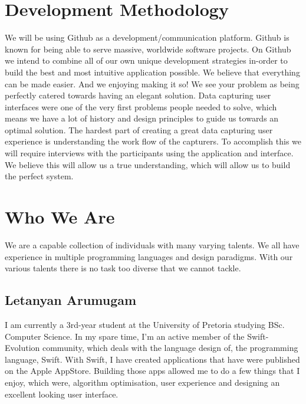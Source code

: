 \documentclass[12pt]{article}
\begin{document}
	\section{Development Methodology}
	We will be using Github as a development/communication platform. Github is known for being able to serve massive, worldwide software projects. On Github we intend to combine all of our own unique development strategies in-order to build the best and most intuitive application possible. We believe that everything can be made easier. And we enjoying making it so! We see your problem as being perfectly catered towards having an elegant solution. Data capturing user interfaces were one of the very first problems people needed to solve, which means we have a lot of history and design principles to guide us towards an optimal solution. The hardest part of creating a great data capturing user experience is understanding the work flow of the capturers. To accomplish this we will require interviews with the participants using the application and interface. We believe this will allow us a true understanding, which will allow us to build the perfect system.
	
	\section{Who We Are}
	We are a capable collection of individuals with many varying talents. We all have experience in multiple programming languages and design paradigms. With our various talents there is no task too diverse that we cannot tackle.
	
	\subsection{Letanyan Arumugam}
I am currently a 3rd-year student at the University of Pretoria studying BSc. Computer Science. In my spare time, I'm an active member of the Swift-Evolution community, which deals with the language design of, the programming language, Swift. With Swift, I have created applications that have were published on the Apple AppStore. Building those apps allowed me to do a few things that I enjoy, which were, algorithm optimisation, user experience and designing an excellent looking user interface.
\end{document}

